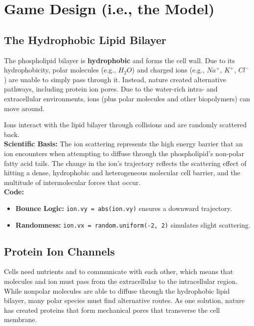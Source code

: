 \documentclass[11pt]{article}
\begin{document}
\section{Game Design (i.e., the Model)}

\subsection{The Hydrophobic Lipid Bilayer}
The phospholipid bilayer is \textbf{hydrophobic} and forms the cell wall. Due to its hydrophobicity, polar molecules (e.g., $H_2O$) and charged ions (e.g., $Na^+$, $K^+$, $Cl^-$) are unable to simply pass through it. Instead, nature created alternative pathways, including protein ion pores. Due to the water-rich intra- and extracellular environments, ions (plus polar molecules and other biopolymers) can move around.

\begin{tcolorbox}[colback=MembraneOrange!10,colframe=MembraneOrange!50!black,title=Game Mechanic: The Lipid Bilayer Barrier]
	Ions interact with the lipid bilayer through collisions and are randomly scattered back.\\

	\textbf{Scientific Basis:} The ion scattering represents the high energy barrier that an ion encounters when attempting to diffuse through the phospholipid's non-polar fatty acid tails. The change in the ion's trajectory reflects the scattering effect of hitting a dense, hydrophobic and heterogeneous molecular cell barrier, and the multitude of intermolecular forces that occur.\\

	\textbf{Code:}
	\begin{itemize}
	    \item \textbf{Bounce Logic:} \texttt{ion.vy = abs(ion.vy)} ensures a downward trajectory.
	    \item \textbf{Randomness:} \texttt{ion.vx = random.uniform(-2, 2)} simulates slight scattering.
	\end{itemize}

\end{tcolorbox}

\subsection{Protein Ion Channels}

Cells need nutrients and to communicate with each other, which means that molecules and ion must pass from the extracellular to the intracellular region. While nonpolar molecules are able to diffuse through the hydrophobic lipid bilayer, many polar species must find alternative routes. As one solution, nature has created proteins that form mechanical pores that transverse the cell membrane.
\end{document}
